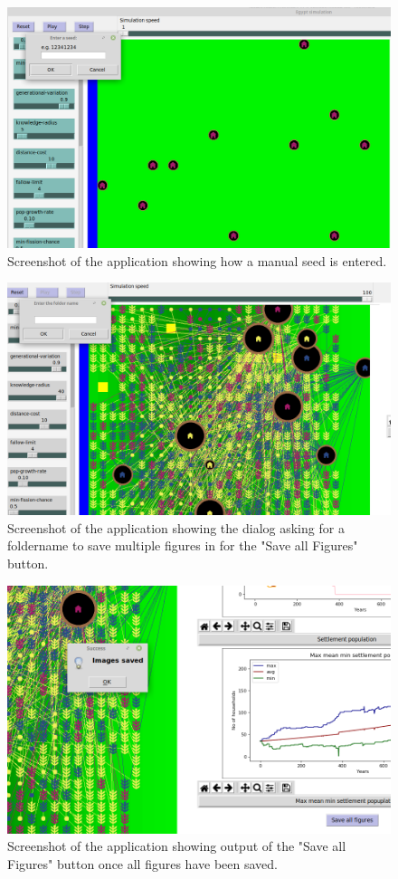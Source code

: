 \documentclass[12pt]{article}
\begin{document}
	\begin{figure}[!htb]
		\includegraphics[width=15cm]{SeedEntry}
		\caption{Screenshot of the application showing how a manual seed is entered.}
		\label{fig:Seed Entry}
	\end{figure}
	
	\begin{figure}[!htb]
		\includegraphics[width=15cm]{SaveAll1}
		\caption{Screenshot of the application showing the dialog asking for a foldername to save multiple figures in for the "Save all Figures" button.}
		\label{fig:SaveAllFolder}
	\end{figure}
	
	\begin{figure}[!htb]
		\includegraphics[width=15cm]{SaveAll2}
		\caption{Screenshot of the application showing output of the "Save all Figures" button once all figures have been saved.}
		\label{fig:SaveAllSaved}
	\end{figure}
\end{document}
